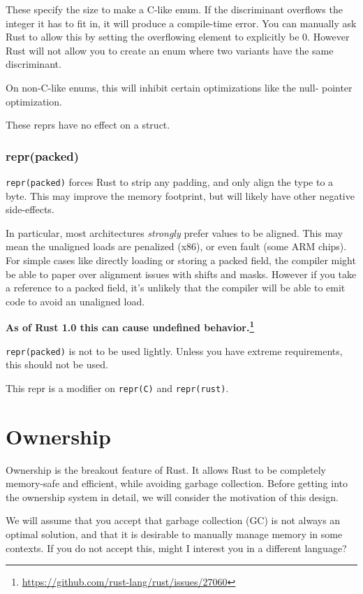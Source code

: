 \documentclass[a4paper,]{book}
\renewcommand*{\hypertarget}[3][\ar]{%
  \def\ar{#2}%
  \label{#1}%
  #3}
\renewcommand{\href}[2]{#2\footnote{\url{#1}}}
\begin{document}
These specify the size to make a C-like enum. If the discriminant
overflows the integer it has to fit in, it will produce a compile-time
error. You can manually ask Rust to allow this by setting the
overflowing element to explicitly be 0. However Rust will not allow you
to create an enum where two variants have the same discriminant.

On non-C-like enums, this will inhibit certain optimizations like the
null- pointer optimization.

These reprs have no effect on a struct.

\subsection{repr(packed)}\label{reprpacked}

\texttt{repr(packed)} forces Rust to strip any padding, and only align
the type to a byte. This may improve the memory footprint, but will
likely have other negative side-effects.

In particular, most architectures \emph{strongly} prefer values to be
aligned. This may mean the unaligned loads are penalized (x86), or even
fault (some ARM chips). For simple cases like directly loading or
storing a packed field, the compiler might be able to paper over
alignment issues with shifts and masks. However if you take a reference
to a packed field, it's unlikely that the compiler will be able to emit
code to avoid an unaligned load.

\textbf{\href{https://github.com/rust-lang/rust/issues/27060}{As of Rust
1.0 this can cause undefined behavior.}}

\texttt{repr(packed)} is not to be used lightly. Unless you have extreme
requirements, this should not be used.

This repr is a modifier on \texttt{repr(C)} and \texttt{repr(rust)}.

\hypertarget{sec--ownership}{\chapter{Ownership}\label{sec--ownership}}

Ownership is the breakout feature of Rust. It allows Rust to be
completely memory-safe and efficient, while avoiding garbage collection.
Before getting into the ownership system in detail, we will consider the
motivation of this design.

We will assume that you accept that garbage collection (GC) is not
always an optimal solution, and that it is desirable to manually manage
memory in some contexts. If you do not accept this, might I interest you
in a different language?
\end{document}
